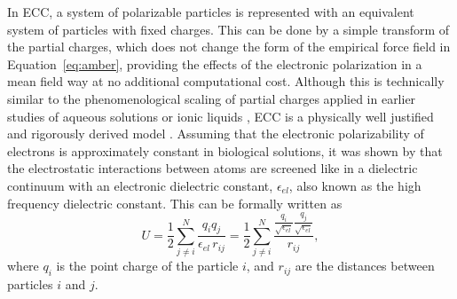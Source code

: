 In ECC, a system of polarizable particles is represented 
with an equivalent system of particles with fixed charges. %
This can be done by a simple transform of the partial charges,
which does not change the form of the empirical force field in Equation~\ref{eq:amber}, 
providing the effects of the electronic polarization in a mean field way at no additional computational cost. 
Although this is technically similar to the phenomenological scaling of partial charges 
applied in earlier studies of aqueous solutions or ionic liquids \citep{jonsson86,egberts94,beichel14},
ECC is a physically well justified and rigorously derived model \citep{leontyev09, leontyev10, leontyev11, leontyev14}.
Assuming that the electronic polarizability of electrons is approximately constant in biological solutions, 
it was shown by \citet{leontyev11} that the electrostatic interactions between atoms 
are screened like in a dielectric continuum 
with an electronic dielectric constant, $\epsilon _{el}$, 
also known as the high frequency dielectric constant. 
This can be formally written as
\begin{equation}  \label{eq:coulomb}
   U = \frac{1}{2} \displaystyle \sum ^N _{j\neq i} \frac{q_i q_j}{\epsilon_{el} \, r_{ij}}  =  \frac{1}{2} \displaystyle \sum ^N _{j\neq i} \frac{\frac{q_i}{\sqrt{\epsilon _{el}}} \frac{q_j}{\sqrt{\epsilon _{el}}}}{r_{ij}}  , 
\end{equation} 
where $q_i$ is the point charge of the particle $i$,
and $r_{ij}$ are the distances between particles $i$ and $j$.
